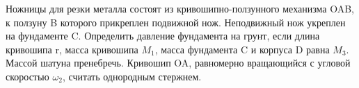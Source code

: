 Ножницы для резки металла состоят из кривошипно-ползунного механизма OAB, к ползуну B которого прикреплен подвижной нож. Неподвижный нож укреплен на фундаменте C. 
Определить давление фундамента на грунт, если длина кривошипа r, масса кривошипа $M_{1}$, масса фундамента C и корпуса D равна $M_{3}$. Массой шатуна пренебречь.
Кривошип OA, равномерно вращающийся с угловой скоростью $\omega_{2}$, считать однородным стержнем.